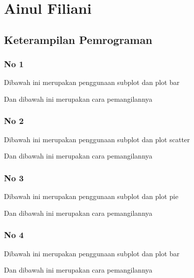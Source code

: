 \section{Ainul Filiani}
\subsection{Keterampilan Pemrograman}
\subsubsection{No 1}
\hfill \break
Dibawah ini merupakan penggunaan subplot dan plot bar

Dan dibawah ini merupakan cara pemangilannya



\subsubsection{No 2}

\hfill \break

Dibawah ini merupakan penggunaan subplot dan plot scatter

Dan dibawah ini merupakan cara pemangilannya



\subsubsection{No 3}

\hfill \break

Dibawah ini merupakan penggunaan subplot dan plot pie

Dan dibawah ini merupakan cara pemangilannya



\subsubsection{No 4}

\hfill \break

Dibawah ini merupakan penggunaan subplot dan plot bar

Dan dibawah ini merupakan cara pemangilannya



